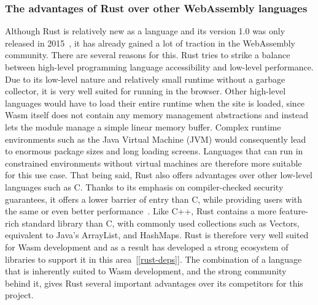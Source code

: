 \subsubsection{The advantages of Rust over other WebAssembly languages} \label{rust-vs-other-wasm}
Although Rust is relatively new as a language and its version 1.0 was only released in 2015~\cite{rustreleases}, it has already gained a lot of traction in the WebAssembly community.
There are several reasons for this. Rust tries to strike a balance between high-level programming language accessibility and low-level performance.
Due to its low-level nature and relatively small runtime without a garbage collector, it is very well suited for running in the browser.
Other high-level languages would have to load their entire runtime when the site is loaded, since Wasm itself does not contain any memory management abstractions and instead lets the module manage a simple linear memory buffer.
Complex runtime environments such as the Java Virtual Machine (JVM) would consequently lead to enormous package sizes and long loading screens.
Languages that can run in constrained environments without virtual machines are therefore more suitable for this use case.
That being said, Rust also offers advantages over other low-level languages such as C. Thanks to its emphasis on compiler-checked security guarantees, it offers a lower barrier of entry than C, while providing users with the same or even better performance~\cite{medin2021performance}.
Like C++, Rust contains a more feature-rich standard library than C, with commonly used collections such as Vectors, equivalent to Java's ArrayList, and HashMaps.
Rust is therefore very well suited for Wasm development and as a result has developed a strong ecosystem of libraries to support it in this area~[\ref{rust-deps}].
The combination of a language that is inherently suited to Wasm development, and the strong community behind it, gives Rust several important advantages over its competitors for this project.


